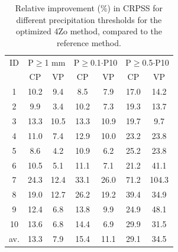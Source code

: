 \documentclass[review]{elsarticle}
\begin{document}
\begin{table}[t]
	\caption{Relative improvement (\%) in CRPSS for different precipitation thresholds for the optimized 4Zo method, compared to the reference method.}
	\footnotesize
	\begin{center}
		\begin{tabular}{ccccccc}
			\hline 
			ID & \multicolumn{2}{c}{P\(\geq\)1 mm} & \multicolumn{2}{c}{P\(\geq\)0.1\(\cdot\)P10} & \multicolumn{2}{c}{P\(\geq\)0.5\(\cdot\)P10} \\ 
			& CP & VP & CP & VP & CP & VP \\ 
			\hline 
			1 & 10.2 & 9.4 & 8.5 & 7.9 & 17.0 & 14.2 \\ 
			2 & 9.9 & 3.4 & 10.2 & 7.3 & 19.3 & 13.7 \\ 
			3 & 13.3 & 10.5 & 13.3 & 10.9 & 19.7 & 9.7 \\ 
			4 & 11.0 & 7.4 & 12.9 & 10.0 & 23.2 & 23.8 \\ 
			5 & 8.6 & 4.2 & 10.9 & 6.2 & 25.2 & 23.8 \\ 
			6 & 10.5 & 5.1 & 11.1 & 7.1 & 21.2 & 41.1 \\ 
			7 & 24.3 & 12.4 & 33.1 & 26.0 & 71.2 & 104.3 \\ 
			8 & 19.0 & 12.7 & 26.2 & 19.2 & 39.4 & 34.9 \\ 
			9 & 12.4 & 6.8 & 13.8 & 9.9 & 24.9 & 48.1 \\ 
			10 & 13.6 & 6.8 & 14.4 & 6.9 & 29.9 & 31.5 \\ 
			\hline 
			av. & 13.3 & 7.9 & 15.4 & 11.1 & 29.1 & 34.5 \\ 
			\hline 
		\end{tabular} 
	\end{center}
	\label{table:scores_thresholds_4Zo}
\end{table}
\end{document}
